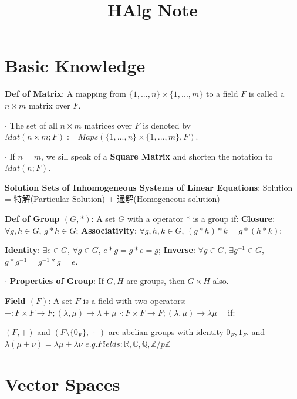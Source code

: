 \documentclass[9pt]{article}
\title{HAlg Note}
\author{}
\date{}
\begin{document}
\maketitle
\thispagestyle{fancy}
\vspace{-3.5cm}

\fontsize{10pt}{11pt}\selectfont
\setlength{\parindent}{8pt}


\section{Basic Knowledge} %

\textbf{Def of Matrix}: A mapping from $\{1,...,n\}\times\{1,...,m\}$ to a field $F$ is called a $n\times m$ matrix over $F$.

$\cdot$ The set of all $n\times m$ matrices over $F$ is denoted by $Mat(n\times m;F):=Maps(\{1,...,n\}\times\{1,...,m\},F)$.

$\cdot$ If $n=m$, we sill speak of a \textbf{Square Matrix} and shorten the notation to $Mat(n;F)$.

\textbf{Solution Sets of Inhomogeneous Systems of Linear Equations}: {\small Solution = 特解(Particular Solution) + 通解(Homogeneous solution)}

\textbf{Def of Group $(G,*)$}: A set $G$ with a operator $*$ is a group if: {\small \textbf{Closure}: $\forall g,h\in G$, $g*h\in G$; \textbf{Associativity}: $\forall g,h,k\in G$, $(g*h)*k=g*(h*k)$;}

\hspace{85pt} {\small \textbf{Identity}: $\exists e\in G$, $\forall g\in G$, $e*g=g*e=g$; \textbf{Inverse}: $\forall g\in G$, $\exists g^{-1}\in G$, $g*g^{-1}=g^{-1}*g=e$.}

$\cdot$ \textbf{Properties of Group}: If $G,H$ are groups, then $G\times H$ also.

\textbf{Field $(F)$}: A set $F$ is a field with two operators: $+:F\times F\to F;(\lambda,\mu)\to\lambda+\mu$ $\cdot:F\times F\to F;(\lambda,\mu)\to\lambda\mu$ \ \ if:

\quad \quad \quad \quad $(F,+)$ and $(F\setminus\{0_F\}, \ \cdot \ )$ are abelian groups with identity $0_F,1_F$. \quad and \quad $\lambda(\mu+\nu)=\lambda\mu+\lambda\nu$ \quad \quad $e.g. Fields:\mathbb{R},\mathbb{C},\mathbb{Q},\mathbb{Z}/p\mathbb{Z}$


\section{Vector Spaces} %
\end{document}
